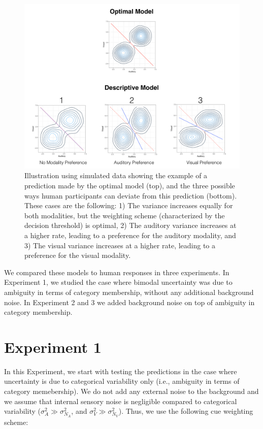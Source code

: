\documentclass[english,floatsintext,man]{apa6}
\theoremstyle{definition}
\theoremstyle{definition}
\theoremstyle{definition}
\theoremstyle{remark}
\begin{document}
\begin{figure}[!h]
\includegraphics[width=\textwidth]{pictures/sub-optimal} \caption{Illustration using simulated data showing the example of a prediction made by the optimal model (top), and the three possible ways human participants can deviate from this prediction (bottom). These cases are the following: 1) The variance increases equally for both modalities, but the weighting scheme (characterized by the decision threshold) is optimal, 2) The auditory variance increases at a higher rate, leading to a preference for the auditory modality, and 3) The visual variance increases at a higher rate, leading to a preference for the visual modality.}\label{fig:subOptim}
\end{figure}

We compared these models to human responses in three experiments. In
Experiment 1, we studied the case where bimodal uncertainty was due to
ambiguity in terms of category membership, without any additional
background noise. In Experiment 2 and 3 we added background noise on top
of ambiguity in category membership.

\section{Experiment 1}\label{experiment-1}

In this Experiment, we start with testing the predictions in the case
where uncertainty is due to categorical variability only (i.e.,
ambiguity in terms of category memebership). We do not add any external
noise to the background and we assume that internal sensory noise is
negligible compared to categorical variability
(\(\sigma^2_{A} \gg \sigma^2_{N_A}\), and
\(\sigma^2_{V} \gg \sigma^2_{N_V}\)). Thus, we use the following cue
weighting scheme:
\end{document}

